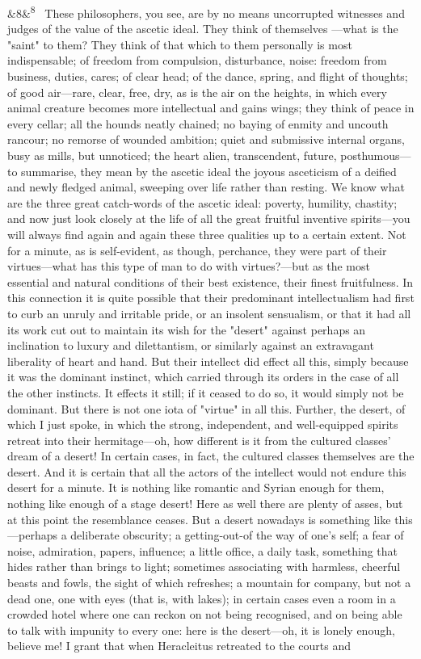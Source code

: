 \documentclass[12pt]{article}
\newcommand{\para}[1][]{\par\noindent\ifx&#1&\else\textsuperscript{\footnotesize #1}~\fi}
\begin{document}
\para[8] These philosophers, you see, are by no means uncorrupted witnesses and judges of the value of the ascetic ideal. They think of themselves ---what is the "saint" to them? They think of that which to them personally is most indispensable; of freedom from compulsion, disturbance, noise: freedom from business, duties, cares; of clear head; of the dance, spring, and flight of thoughts; of good air---rare, clear, free, dry, as is the air on the heights, in which every animal creature becomes more intellectual and gains wings; they think of peace in every cellar; all the hounds neatly chained; no baying of enmity and uncouth rancour; no remorse of wounded ambition; quiet and submissive internal organs, busy as mills, but unnoticed; the heart alien, transcendent, future, posthumous---to summarise, they mean by the ascetic ideal the joyous asceticism of a deified and newly fledged animal, sweeping over life rather than resting. We know what are the three great catch-words of the ascetic ideal: poverty, humility, chastity; and now just look closely at the life of all the great fruitful inventive spirits---you will always find again and again these three qualities up to a certain extent. Not for a minute, as is self-evident, as though, perchance, they were part of their virtues---what has this type of man to do with virtues?---but as the most essential and natural conditions of their best existence, their finest fruitfulness. In this connection it is quite possible that their predominant intellectualism had first to curb an unruly and irritable pride, or an insolent sensualism, or that it had all its work cut out to maintain its wish for the "desert" against perhaps an inclination to luxury and dilettantism, or similarly against an extravagant liberality of heart and hand. But their intellect did effect all this, simply because it was the dominant instinct, which carried through its orders in the case of all the other instincts. It effects it still; if it ceased to do so, it would simply not be dominant. But there is not one iota of "virtue" in all this. Further, the desert, of which I just spoke, in which the strong, independent, and well-equipped spirits retreat into their hermitage---oh, how different is it from the cultured classes' dream of a desert! In certain cases, in fact, the cultured classes themselves are the desert. And it is certain that all the actors of the intellect would not endure this desert for a minute. It is nothing like romantic and Syrian enough for them, nothing like enough of a stage desert! Here as well there are plenty of asses, but at this point the resemblance ceases. But a desert nowadays is something like this---perhaps a deliberate obscurity; a getting-out-of the way of one's self; a fear of noise, admiration, papers, influence; a little office, a daily task, something that hides rather than brings to light; sometimes associating with harmless, cheerful beasts and fowls, the sight of which refreshes; a mountain for company, but not a dead one, one with eyes (that is, with lakes); in certain cases even a room in a crowded hotel where one can reckon on not being recognised, and on being able to talk with impunity to every one: here is the desert---oh, it is lonely enough, believe me! I grant that when Heracleitus retreated to the courts and 
\end{document}

